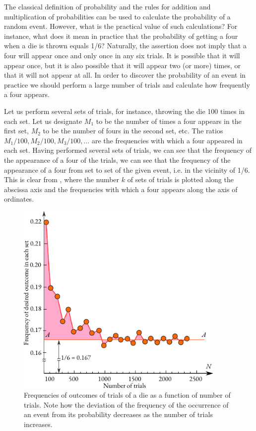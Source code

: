  The classical
definition of probability and the rules for addition and
multiplication of probabilities can be used to calculate the
probability of a random event. However, what is the practical value of
such calculations? For instance, what does it mean in practice that
the probability of getting a four when a die is thrown equals 1/6? Naturally, the assertion does not imply that a four will appear once and only once in any six trials. It is possible that it will appear once, but it is also possible that it will appear two (or more) times, or that it will not appear at all. In order to discover the probability of an event in practice we should perform a large number of trials and calculate how frequently a four appears.


Let us perform several sets of trials, for instance, throwing the die
100 times in each set. Let us designate $M_{1}$ to be the number of
times a four appears in the first set, $M_{2}$ to be the
number of fours in the second set, etc. The ratios
$M_{1}/100, M_{2}/100, M_{3}/100, \ldots{} $ are the frequencies with
which a four appeared in each set. Having performed several sets of
trials, we can see that the frequency of the appearance of a four
 of the trials, we can see that the frequency of the
appearance of a four  from set to set  of the given event,
i.e. in the vicinity of 1/6. This is clear from , where the number $k$ of sets of trials is plotted along the abscissa axis and the frequencies with which a four appears along
the axis of ordinates. 

\begin{figure}%
 \centering
 \includegraphics[width=0.9\textwidth]{figures/die-graph2.pdf}
\caption{Frequencies of outcomes of trials of a die as a function of number of trials. Note how the deviation of the frequency of the occurrence of an event from its probability decreases as the number of trials increases.\label{die-graph2}}
 \end{figure}
 
